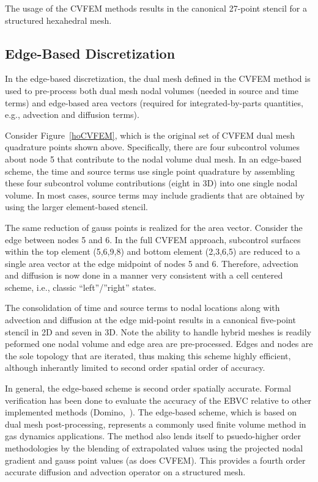 The usage of the CVFEM methods results in the canonical 27-point stencil
for a structured hexahedral mesh.

\subsection{Edge-Based Discretization}
In the edge-based discretization, the dual mesh defined in the CVFEM
method is used to pre-process both dual mesh nodal volumes (needed in
source and time terms) and edge-based area vectors (required for integrated-by-parts
quantities, e.g., advection and diffusion terms).

Consider Figure~\ref{hoCVFEM}, which is the original set of CVFEM
dual mesh quadrature points shown above. Specifically, there are four subcontrol
volumes about node 5 that contribute to the nodal volume dual mesh.
In an edge-based scheme, the time and source terms use single point
quadrature by assembling these four subcontrol volume contributions
(eight in 3D) into one single nodal volume. In most cases, source terms
may include gradients that are obtained by using the larger element-based
stencil.

The same reduction of gauss points is realized for the area vector.
Consider the edge between nodes 5 and 6. In the full CVFEM approach,
subcontrol surfaces within the top element (5,6,9,8) and bottom
element (2,3,6,5) are reduced to a single area vector at the 
edge midpoint of nodes 5 and 6. Therefore, advection and diffusion
is now done in a manner very consistent with a cell centered scheme, i.e.,
classic ``left''/''right'' states.

The consolidation of time and source terms to nodal locations along with
advection and diffusion at the edge mid-point results in a canonical
five-point stencil in 2D and seven in 3D. Note the ability to handle
hybrid meshes is readily peformed one nodal volume and edge area are
pre-processed. Edges and nodes are the sole topology that are iterated,
thus making this scheme highly efficient, although inherantly limited to 
second order spatial order of accuracy.

In general, the edge-based scheme is second order spatially accurate.
Formal verification has been done to evaluate the accuracy of the EBVC
relative to other implemented methods (Domino,~\cite{Domino:2014}). The edge-based scheme,
which is based on dual mesh post-processing, represents a commonly used finite volume 
method in gas dynamics applications. The method also lends itself to psuedo-higher order 
methodologies by the blending of extrapolated values using the projected nodal 
gradient and gauss point values (as does CVFEM). This provides a fourth order
accurate diffusion and advection operator on a structured mesh.

